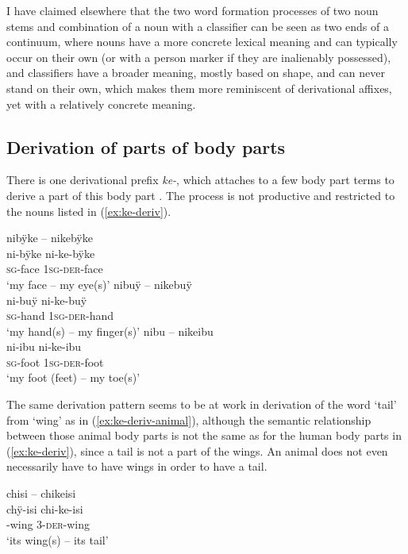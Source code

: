 I have claimed elsewhere \citep[178--180]{Terhart2016} that the two word formation processes of  two noun stems and combination of a noun with a classifier can be seen as two ends of a continuum, where nouns have a more concrete lexical meaning and can typically occur on their own (or with a person marker if they are inalienably possessed), and classifiers have a broader meaning, mostly based on shape, and can never stand on their own, which makes them more reminiscent of derivational affixes, yet with a relatively concrete meaning.

\subsection{Derivation of parts of body parts}\label{sec:BodyPartofPartDerivation}

There is one derivational prefix \textit{ke-}, which attaches to a few body part terms to derive a part of this body part \citep[]{TerhartDanielsenBODY}. The process is not productive and restricted to the nouns listed in (\ref{ex:ke-deriv}).

\ea\label{ex:ke-deriv}
  \ea
 \begingl 
\glpreamble nibÿke – nikebÿke\\
\gla ni-bÿke ni-ke-bÿke\\ 
\textsc{sg}-face 1\textsc{sg}-\textsc{der}-face\\ 
\glft ‘my face – my eye(s)’
  \ex
 \begingl
\glpreamble nibuÿ – nikebuÿ\\
\gla ni-buÿ ni-ke-buÿ\\ 
\textsc{sg}-hand 1\textsc{sg}-\textsc{der}-hand\\ 
\glft ‘my hand(s) – my finger(s)’
  \ex
 \begingl
\glpreamble nibu – nikeibu\\
\gla ni-ibu ni-ke-ibu\\
\textsc{sg}-foot 1\textsc{sg}-\textsc{der}-foot\\
\glft ‘my foot (feet) – my toe(s)’
\endgl
\z
\xe

The same derivation pattern seems to be at work in derivation of the word ‘tail’ from ‘wing’ as in (\ref{ex:ke-deriv-animal}), although the semantic relationship between those animal body parts is not the same as for the human body parts in (\ref{ex:ke-deriv}), since a tail is not a part of the wings. An animal does not even necessarily have to have wings in order to have a tail.

\ea\label{ex:ke-deriv-animal}
\begingl 
\glpreamble chisi – chikeisi\\
\gla chÿ-isi chi-ke-isi\\ 
-wing 3-\textsc{der}-wing\\ 
\glft ‘its wing(s) – its tail’
\xe


